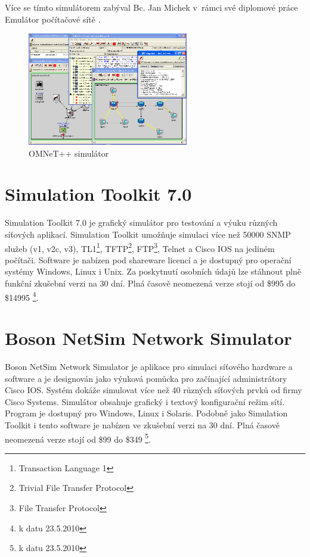 Více se tímto simulátorem zabýval Bc. Jan Michek v~rámci své diplomové práce Emulátor počítačové sítě \cite{reserse:omnet_dp}.

\begin{figure}[h]
\begin{center}
\includegraphics[width=7cm]{figures/r_omnet}
\caption{OMNeT++ simulátor}
\label{fig:r_omnet}
\end{center}
\end{figure}


\section{Simulation Toolkit 7.0} 
Simulation Toolkit 7.0 \cite{reserse:adventnet} je grafický simulátor pro testování a výuku různých síťových aplikací. Simulation Toolkit umožňuje simulaci více než 50000 SNMP služeb (v1, v2c, v3), TL1\footnote{Transaction Language 1}, TFTP\footnote{Trivial File Transfer Protocol }, FTP\footnote{File Transfer Protocol}, Telnet a Cisco IOS na jediném počítači. Software je nabízen pod shareware licencí a je dostupný pro operační systémy Windows, Linux i Unix. Za poskytnutí osobních údajů lze stáhnout plně funkční zkušební verzi na 30 dní. Plná časově neomezená verze stojí od \$995 do \$14995 \footnote{k datu 23.5.2010}.


\section{Boson NetSim Network Simulator} 
Boson NetSim Network Simulator \cite{reserse:boson} je aplikace pro simulaci síťového hardware a software a je designován jako výuková pomůcka pro začínající administrátory Cisco IOS. Systém dokáže simulovat více než 40 různých síťových prvků od firmy Cisco Systems. Simulátor obsahuje grafický i textový konfigurační režim sítí. Program je dostupný pro Windows, Linux i Solaris. Podobně jako Simulation Toolkit i tento software je nabízen ve zkušební verzi na 30 dní. Plná časově neomezená verze stojí od \$99 do \$349 \footnote{k datu 23.5.2010}.

